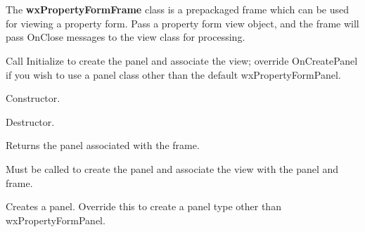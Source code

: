 \section{}\label{wxpropertyformframe}

The {\bf wxPropertyFormFrame} class is a prepackaged frame which can
be used for viewing a property form. Pass a property form view object, and the frame
will pass OnClose messages to the view class for processing.

Call Initialize to create the panel and associate the view; override OnCreatePanel
if you wish to use a panel class other than the default wxPropertyFormPanel.




Constructor.



Destructor.



Returns the panel associated with the frame.



Must be called to create the panel and associate the view with the panel and frame.



Creates a panel. Override this to create a panel type other than wxPropertyFormPanel.

